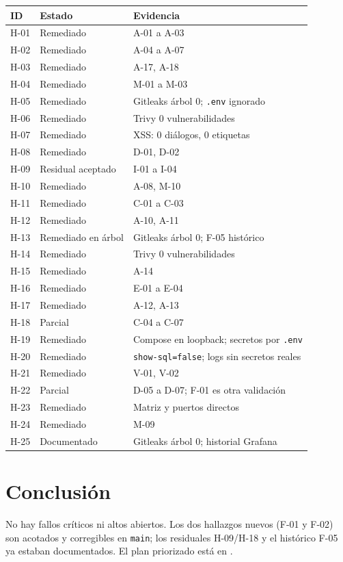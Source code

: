 \documentclass[11pt]{article}
\begin{document}
\begin{longtable}{@{}p{1.2cm}p{6.0cm}p{7.4cm}@{}}
\toprule
ID & Estado & Evidencia \\
\midrule
H-01 & Remediado & A-01 a A-03 \\
H-02 & Remediado & A-04 a A-07 \\
H-03 & Remediado & A-17, A-18 \\
H-04 & Remediado & M-01 a M-03 \\
H-05 & Remediado & Gitleaks árbol 0; \texttt{.env} ignorado \\
H-06 & Remediado & Trivy 0 vulnerabilidades \\
H-07 & Remediado & XSS: 0 diálogos, 0 etiquetas \\
H-08 & Remediado & D-01, D-02 \\
H-09 & Residual aceptado & I-01 a I-04 \\
H-10 & Remediado & A-08, M-10 \\
H-11 & Remediado & C-01 a C-03 \\
H-12 & Remediado & A-10, A-11 \\
H-13 & Remediado en árbol & Gitleaks árbol 0; F-05 histórico \\
H-14 & Remediado & Trivy 0 vulnerabilidades \\
H-15 & Remediado & A-14 \\
H-16 & Remediado & E-01 a E-04 \\
H-17 & Remediado & A-12, A-13 \\
H-18 & Parcial & C-04 a C-07 \\
H-19 & Remediado & Compose en loopback; secretos por \texttt{.env} \\
H-20 & Remediado & \texttt{show-sql=false}; logs sin secretos reales \\
H-21 & Remediado & V-01, V-02 \\
H-22 & Parcial & D-05 a D-07; F-01 es otra validación \\
H-23 & Remediado & Matriz y puertos directos \\
H-24 & Remediado & M-09 \\
H-25 & Documentado & Gitleaks árbol 0; historial Grafana \\
\bottomrule
\end{longtable}

\section{Conclusión}

No hay fallos críticos ni altos abiertos. Los dos hallazgos nuevos (F-01 y F-02)
son acotados y corregibles en \texttt{main}; los residuales H-09/H-18 y el
histórico F-05 ya estaban documentados. El plan priorizado está en
.
\end{document}
